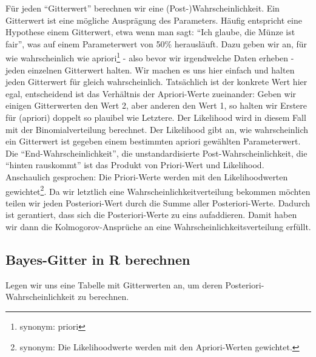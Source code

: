 \documentclass[
  a4paper,
  DIV=11]{scrreprt}
\theoremstyle{definition}
\theoremstyle{remark}
\begin{document}
Für jeden ``Gitterwert'' berechnen wir eine (Post-)Wahrscheinlichkeit.
Ein Gitterwert ist eine mögliche Ausprägung des Parameters. Häufig
entspricht eine Hypothese einem Gitterwert, etwa wenn man sagt: ``Ich
glaube, die Münze ist fair'', was auf einem Parameterwert von 50\%
herausläuft. Dazu geben wir an, für wie wahrscheinlich wie
apriori\footnote{synonym: priori} - also bevor wir irgendwelche Daten
erheben - jeden einzelnen Gitterwert halten. Wir machen es uns hier
einfach und halten jeden Gitterwert für gleich wahrscheinlich.
Tatsächlich ist der konkrete Wert hier egal, entscheidend ist das
Verhältnis der Apriori-Werte zueinander: Geben wir einigen Gitterwerten
den Wert 2, aber anderen den Wert 1, so halten wir Erstere für (apriori)
doppelt so plauibel wie Letztere. Der Likelihood wird in diesem Fall mit
der Binomialverteilung berechnet. Der Likelihood gibt an, wie
wahrscheinlich ein Gitterwert ist gegeben einem bestimmten apriori
gewählten Parameterwert. Die ``End-Wahrscheinlichkeit'', die
unstandardisierte Post-Wahrscheinlichkeit, die ``hinten rauskommt'' ist
das Produkt von Priori-Wert und Likelihood. Anschaulich gesprochen: Die
Priori-Werte werden mit den Likelihoodwerten gewichtet\footnote{synonym:
  Die Likelihoodwerte werden mit den Apriori-Werten gewichtet.}. Da wir
letztlich eine Wahrscheinlichkeitverteilung bekommen möchten teilen wir
jeden Posteriori-Wert durch die Summe aller Posteriori-Werte. Dadurch
ist gerantiert, dass sich die Posteriori-Werte zu eins aufaddieren.
Damit haben wir dann die Kolmogorov-Ansprüche an eine
Wahrscheinlichkeitsverteilung erfüllt.

\hypertarget{bayes-gitter-in-r-berechnen}{%
\subsection{Bayes-Gitter in R
berechnen}\label{bayes-gitter-in-r-berechnen}}

Legen wir uns eine Tabelle mit Gitterwerten an, um deren
Posteriori-Wahrscheinlichkeit zu berechnen.
\end{document}

